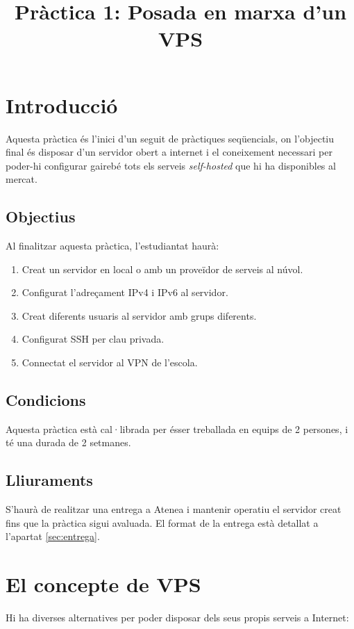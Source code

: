 \documentclass{practicaitic}
\title{Pràctica 1: Posada en marxa d'un VPS}
\begin{document}
\section{Introducció}

Aquesta pràctica és l'inici d'un seguit de pràctiques seqüencials, on
l'objectiu final és disposar d'un servidor obert a internet i el coneixement
necessari per poder-hi configurar gairebé tots els serveis \textit{self-hosted}
que hi ha disponibles al mercat.

\subsection{Objectius}

Al finalitzar aquesta pràctica, l'estudiantat haurà:
\begin{enumerate}
  \item Creat un servidor en local o amb un proveïdor de serveis al núvol.
  \item Configurat l'adreçament IPv4 i IPv6 al servidor.
  \item Creat diferents usuaris al servidor amb grups diferents.
  \item Configurat SSH per clau privada.
  \item Connectat el servidor al VPN de l'escola.
\end{enumerate}

\subsection{Condicions}

Aquesta pràctica està cal·librada per ésser treballada en equips de 2 persones,
i té una durada de 2 setmanes.

\subsection{Lliuraments}

S'haurà de realitzar una entrega a Atenea i mantenir operatiu el servidor creat
fins que la pràctica sigui avaluada. El format de la entrega està detallat a
l'apartat \ref{sec:entrega}.

\section{El concepte de VPS}

Hi ha diverses alternatives per poder disposar dels seus propis serveis a
Internet:
\end{document}
